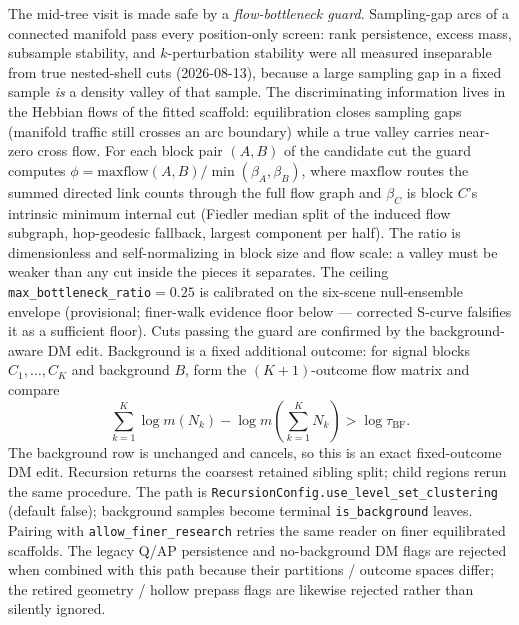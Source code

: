 \documentclass[11pt]{article}
\begin{document}
The mid-tree visit is made safe by a \emph{flow-bottleneck guard}.
Sampling-gap arcs of a connected manifold pass every position-only
screen: rank persistence, excess mass, subsample stability, and
$k$-perturbation stability were all measured inseparable from true
nested-shell cuts (2026-08-13), because a large sampling gap in a fixed
sample \emph{is} a density valley of that sample. The discriminating
information lives in the Hebbian flows of the fitted scaffold:
equilibration closes sampling gaps (manifold traffic still crosses an
arc boundary) while a true valley carries near-zero cross flow. For each
block pair $(A,B)$ of the candidate cut the guard computes
$\phi = \mathrm{maxflow}(A,B) / \min(\beta_A,\beta_B)$, where
$\mathrm{maxflow}$ routes the summed directed link counts through the
full flow graph and $\beta_C$ is block $C$'s intrinsic minimum
internal cut (Fiedler median split of the induced flow subgraph,
hop-geodesic fallback, largest component per half). The ratio is
dimensionless and self-normalizing in block size and flow scale:
a valley must be weaker than any cut inside the pieces it separates.
The ceiling \texttt{max\_bottleneck\_ratio}${}=0.25$ is calibrated
on the six-scene null-ensemble envelope (provisional; finer-walk
evidence floor below --- corrected S-curve falsifies it as a
sufficient floor).
Cuts passing the guard are confirmed by the
background-aware DM edit. Background is
a fixed additional outcome: for signal blocks
$C_1,\ldots,C_K$ and background $B$, form the $(K+1)$-outcome flow
matrix and compare
\[
 \sum_{k=1}^{K}\log m(N_k)-\log m\!\left(\sum_{k=1}^{K}N_k\right)
 > \log\tau_{\mathrm{BF}}.
\]
The background row is unchanged and cancels, so this is an exact
fixed-outcome DM edit. Recursion returns the coarsest retained sibling
split; child regions rerun the same procedure. The path is
\texttt{RecursionConfig.use\_level\_set\_clustering} (default false);
background samples become terminal \texttt{is\_background} leaves.
Pairing with \texttt{allow\_finer\_research} retries the same reader on
finer equilibrated scaffolds. The legacy Q/AP persistence and no-background
DM flags are rejected when combined with this path because their
partitions / outcome spaces differ; the retired geometry / hollow prepass
flags are likewise rejected rather than silently ignored.
\end{document}
